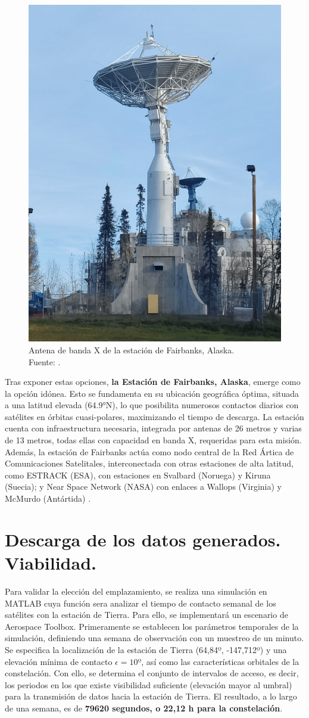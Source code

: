 \begin{figure}[H]
    \centering
    \includegraphics[width=.5\linewidth]{7.Segmento_Tierra/AS3_oct-4-2022-1-scaled.png}
    \caption{Antena de banda X de la estación de Fairbanks, Alaska. \\
    Fuente: \cite{ASF2025_NSN}.}
\end{figure}

Tras exponer estas opciones, \textbf{la Estación de Fairbanks, Alaska}, emerge como la opción idónea. Esto se fundamenta en su ubicación geográfica óptima, situada a una latitud elevada (64.9°N), lo que posibilita numerosos contactos diarios con satélites en órbitas cuasi-polares, maximizando el tiempo de descarga. La estación cuenta con infraestructura necesaria, integrada por antenas de 26 metros y varias de 13 metros, todas ellas con capacidad en banda X, requeridas para esta misión. Además, la estación de Fairbanks actúa como nodo central de la Red Ártica de Comunicaciones Satelitales, interconectada con otras estaciones de alta latitud, como ESTRACK (ESA), con estaciones en Svalbard (Noruega) y Kiruna (Suecia); y  Near Space Network (NASA) con enlaces a Wallops (Virginia) y McMurdo (Antártida) \cite{noaa_fairbanks_2023}.

\section{Descarga de los datos generados. Viabilidad.}

Para validar la elección del emplazamiento, se realiza una simulación en MATLAB cuya función sera analizar el tiempo de contacto semanal de los satélites con la estación de Tierra. Para ello, se implementará un escenario de Aerospace Toolbox. 
Primeramente se establecen los parámetros temporales de la simulación, definiendo una semana de observación con un muestreo de un minuto. Se especifica la localización de la estación de Tierra (64,84º, -147,712º) y una elevación mínima de contacto $\epsilon = 10º$, así como las características orbitales de la constelación. Con ello, se determina el conjunto de intervalos de acceso, es decir, los periodos en los que existe visibilidad suficiente (elevación mayor al umbral) para la transmisión de datos hacia la estación de Tierra. El resultado, a lo largo de una semana, es de \textbf{79620 segundos, o 22,12 h para la constelación}.

